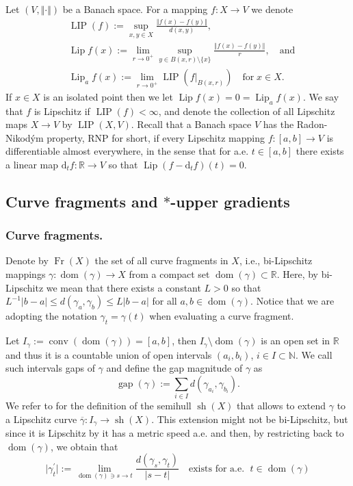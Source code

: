 \documentclass{amsart}
\numberwithin{equation}{section}
\newcommand{\R}{\mathbb{R}}
\newcommand{\N}{\mathbb{N}}
\newcommand{\Lip}{\operatorname{Lip}}
\newcommand{\LIP}{\operatorname{LIP}}
\newcommand{\gap}{\operatorname{gap}}
\newcommand{\dom}{\operatorname{dom}}
\newcommand{\Fr}{\operatorname{Fr}}
\newcommand{\conv}{\operatorname{conv}}
\newcommand{\sh}{\operatorname{sh}}
\newcommand{\ud}{\mathrm {d}}
\begin{document}

Let $(V,\Vert\cdot\Vert )$ be a Banach space. For a mapping $f:X\rightarrow V$ we denote
\begin{align*}
&\LIP (f):=\sup_{x,y\in X}\frac{\Vert f(x)-f(y)\Vert}{d(x,y)},\\
&\Lip f(x):=\lim_{r\to 0^+}\sup_{y\in B(x,r)\setminus\{ x\}}\frac{\Vert f(x)-f(y)\Vert}{r},\quad\mbox{and}\\
&\Lip_af(x):=\lim_{r\to 0^+}\LIP(f|_{B(x,r)})\quad \mbox{for}\; x\in X.
\end{align*}
If $x\in X$ is an isolated point then we let $\Lip f(x)=0=\Lip_af(x)$. We say that $f$ is Lipschitz if $\LIP (f)<\infty $, and denote the collection of all Lipschitz maps $X\to V$ by $\LIP (X,V)$. Recall that a Banach space $V$ has the Radon-Nikodým property, RNP for short, if every Lipschitz mapping $f:[a,b]\rightarrow V$ is differentiable almost everywhere, in the sense that for a.e. $t\in [a,b]$ there exists a linear map $\ud_tf:\R\rightarrow V$ so that 
$\Lip (f-\ud_tf)(t)=0$.



\subsection{Curve fragments and $*$-upper gradients}

\subsubsection*{Curve fragments.} Denote by $\Fr (X)$ the set of all curve fragments in $X$, i.e., bi-Lipschitz mappings $\gamma :\dom (\gamma )\rightarrow X$ from a compact set $\dom (\gamma )\subset \R$. Here, by bi-Lipschitz we mean that there exists a constant $L>0$ so that $L^{-1}|b-a|\leq d(\gamma_a,\gamma_b)\leq L|b-a|$ for all $a,b\in\dom (\gamma )$. Notice that we are adopting the notation $\gamma_t=\gamma (t)$ when evaluating a curve fragment.

Let $I_\gamma :=\conv (\dom (\gamma ))=[a,b]$, then $I_\gamma\setminus\dom (\gamma )$ is an open set in $\R$ and thus it is a countable union of open intervals $(a_i,b_i)$, $i\in I\subset \N$. We call such intervals gaps of $\gamma$ and define the gap magnitude of $\gamma$ as
$$\gap (\gamma ):=\sum_{i\in I} d(\gamma_{a_i},\gamma_{b_i}).$$
We refer to \cite[Section 2.2]{tsd24} for the definition of the semihull $\sh (X)$ that allows to extend $\gamma$ to a Lipschitz curve $\overline{\gamma}:I_\gamma\rightarrow \sh (X)$. This extension might not be bi-Lipschitz, but since it is Lipschitz by \cite[Proposition 1]{kir94} it has a metric speed a.e.  and then, by restricting back to $\dom (\gamma )$, we obtain that
$$\vert\gamma^\prime_t\vert :=\lim_{\dom (\gamma )\ni s\to t}\frac{d(\gamma_s,\gamma_t)}{|s-t|}\quad\mbox{exists for a.e. }\; t\in \dom(\gamma)$$
\end{document}
